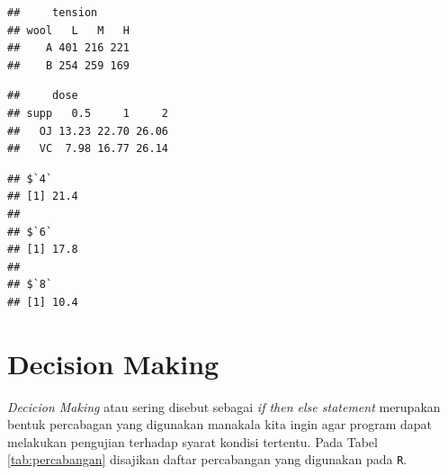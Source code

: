 \documentclass[
]{book}
\newenvironment{Shaded}{\begin{snugshade}}{\end{snugshade}}
\newcommand{\AttributeTok}[1]{\textcolor[rgb]{0.13,0.29,0.53}{#1}}
\newcommand{\CommentTok}[1]{\textcolor[rgb]{0.56,0.35,0.01}{\textit{#1}}}
\newcommand{\ConstantTok}[1]{\textcolor[rgb]{0.56,0.35,0.01}{#1}}
\newcommand{\DecValTok}[1]{\textcolor[rgb]{0.00,0.00,0.81}{#1}}
\newcommand{\FunctionTok}[1]{\textcolor[rgb]{0.13,0.29,0.53}{\textbf{#1}}}
\newcommand{\NormalTok}[1]{#1}
\newcommand{\SpecialCharTok}[1]{\textcolor[rgb]{0.81,0.36,0.00}{\textbf{#1}}}
\theoremstyle{definition}
\theoremstyle{definition}
\theoremstyle{definition}
\theoremstyle{definition}
\theoremstyle{remark}
\begin{document}
\begin{verbatim}
##     tension
## wool   L   M   H
##    A 401 216 221
##    B 254 259 169
\end{verbatim}

\begin{Shaded}
\end{Shaded}

\begin{verbatim}
##     dose
## supp   0.5     1     2
##   OJ 13.23 22.70 26.06
##   VC  7.98 16.77 26.14
\end{verbatim}

\begin{Shaded}
\end{Shaded}

\begin{verbatim}
## $`4`
## [1] 21.4
## 
## $`6`
## [1] 17.8
## 
## $`8`
## [1] 10.4
\end{verbatim}

\hypertarget{dm}{%
\section{Decision Making}\label{dm}}

\emph{Decicion Making} atau sering disebut sebagai \emph{if then else statement} merupakan bentuk percabagan yang digunakan manakala kita ingin agar program dapat melakukan pengujian terhadap syarat kondisi tertentu. Pada Tabel \ref{tab:percabangan} disajikan daftar percabangan yang digunakan pada \texttt{R}.
\end{document}
